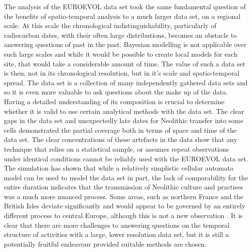 The analysis of the EUROEVOL data set took the same fundamental question of the benefits of spatio-temporal analysis to a much larger data set, on a regional scale. At this scale the chronological indistinguishability, particularly of radiocarbon dates, with their often large distributions, becomes an obstacle to answering questions of past in the past. Bayesian modelling is not applicable over such large scales and while it would be possible to create local models for each site, that would take a considerable amount of time. The value of such a data set is then, not in its chronological resolution, but in it's scale and spatio-temporal spread. The data set is a collection of many independently gathered data sets and so it is even more valuable to ask questions about the make up of the data. Having a detailed understanding of its composition is crucial to determine whether it is valid to use certain analytical methods with the data set. The clear gaps in the data set and unexpectedly late dates for Neolithic transfer into some cells demonstrated the partial coverage both in terms of space and time of the data set. The clear concentrations of these artefacts in the data show that any technique that relies on a statistical sample, or assumes repeat observations under identical conditions cannot be reliably used with the EUROEVOL data set. The simulation has shown that while a relatively simplistic cellular automata model can be used to model the data set in part, the lack of comparability for the entire duration indicates that the transmission of Neolithic culture and practises was a much more nuanced process. Some areas, such as northern France and the British Isles deviate significantly and would appear to be governed by an entirely different process to central Europe, although this is not a new observation \citep{gkiasta2003neolithic}. It is clear that there are more challenges to answering questions on the temporal structure of activities with a large, lower resolution data set, but it is still a potentially fruitful endeavour provided suitable methods are chosen.

